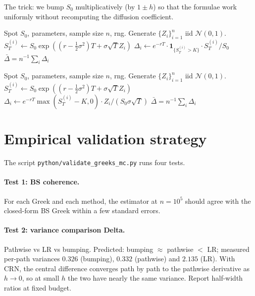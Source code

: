 \documentclass[11pt,a4paper]{article}
\theoremstyle{plain}
\theoremstyle{definition}
\theoremstyle{remark}
\newcommand{\indic}{\mathbf{1}}
\begin{document}
The trick: we bump $S_0$ multiplicatively (by $1 \pm h$) so that
the formulae work uniformly without recomputing the diffusion
coefficient.

\begin{algorithm}[H]
\caption{Pathwise Delta}
\label{alg:pathwise}
\begin{algorithmic}[1]
\Require Spot $S_0$, parameters, sample size $n$, rng.
\State Generate $\{Z_i\}_{i=1}^n$ iid $\mathcal N(0, 1)$.
\State $S_T^{(i)} \gets S_0 \exp((r - \tfrac{1}{2}\sigma^2)T + \sigma\sqrt T Z_i)$
\State $\Delta_i \gets e^{-rT} \cdot \indic_{\{S_T^{(i)} > K\}} \cdot S_T^{(i)} / S_0$
\EndFor
\State \Return $\bar\Delta = n^{-1} \sum_i \Delta_i$
\end{algorithmic}
\end{algorithm}

\begin{algorithm}[H]
\caption{Likelihood-ratio Delta}
\label{alg:lr}
\begin{algorithmic}[1]
\Require Spot $S_0$, parameters, sample size $n$, rng.
\State Generate $\{Z_i\}_{i=1}^n$ iid $\mathcal N(0, 1)$.
\State $S_T^{(i)} \gets S_0 \exp((r - \tfrac{1}{2}\sigma^2)T + \sigma\sqrt T Z_i)$
\State $\Delta_i \gets e^{-rT} \max(S_T^{(i)} - K, 0) \cdot Z_i / (S_0 \sigma \sqrt T)$
\EndFor
\State \Return $\bar\Delta = n^{-1} \sum_i \Delta_i$
\end{algorithmic}
\end{algorithm}

\section{Empirical validation strategy}
\label{sec:validation}

The script \texttt{python/validate\_greeks\_mc.py} runs four
tests.

\paragraph{Test 1: BS coherence.} For each Greek and each method,
the estimator at $n = 10^5$ should agree with the closed-form BS
Greek within a few standard errors.

\paragraph{Test 2: variance comparison Delta.} Pathwise vs LR vs
bumping. Predicted: bumping $\approx$ pathwise $<$ LR; measured
per-path variances $0.326$ (bumping), $0.332$ (pathwise) and $2.135$
(LR). With CRN, the central difference converges path by path to the
pathwise derivative as $h \to 0$, so at small $h$ the two have nearly
the same variance. Report half-width ratios at fixed budget.
\end{document}
